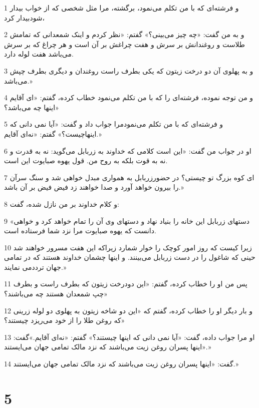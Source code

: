 \par 1 و فرشته‌ای که با من تکلم می‌نمود، برگشته، مرا مثل شخصی که از خواب بیدار شودبیدار کرد،
\par 2 و به من گفت: «چه چیز می‌بینی؟» گفتم: «نظر کردم و اینک شمعدانی که تمامش طلاست و روغندانش بر سرش و هفت چراغش بر آن است و هر چراغ که بر سرش می‌باشد هفت لوله دارد.
\par 3 و به پهلوی آن دو درخت زیتون که یکی بطرف راست روغندان و دیگری بطرف چپش می‌باشد.»
\par 4 و من توجه نموده، فرشته‌ای را که با من تکلم می‌نمود خطاب کرده، گفتم: «ای آقایم اینها چه می‌باشد؟»
\par 5 و فرشته‌ای که با من تکلم می‌نمودمرا جواب داد و گفت: «آیا نمی دانی که اینهاچیست؟» گفتم: «نه‌ای آقایم.»
\par 6 او در جواب من گفت: «این است کلامی که خداوند به زربابل می‌گوید: نه به قدرت و نه به قوت بلکه به روح من. قول یهوه صبایوت این است.
\par 7 ‌ای کوه بزرگ تو چیستی؟ در حضورزربابل به همواری مبدل خواهی شد و سنگ سرآن را بیرون خواهد آورد و صدا خواهند زد فیض فیض بر آن باشد.»
\par 8 و کلام خداوند بر من نازل شده، گفت:
\par 9 «دستهای زربابل این خانه را بنیاد نهاد و دستهای وی آن را تمام خواهد کرد و خواهی دانست که یهوه صبایوت مرا نزد شما فرستاده است.
\par 10 زیرا کیست که روز امور کوچک را خوار شمارد زیراکه این هفت مسرور خواهند شد حینی که شاغول را در دست زربابل می‌بینند. و اینها چشمان خداوند هستند که در تمامی جهان ترددمی نمایند.»
\par 11 پس من او را خطاب کرده، گفتم: «این دودرخت زیتون که بطرف راست و بطرف چپ شمعدان هستند چه می‌باشند؟»
\par 12 و بار دیگر او را خطاب کرده، گفتم که «این دو شاخه زیتون به پهلوی دو لوله زرینی که روغن طلا را از خود می‌ریزد چیستند؟»
\par 13 او مرا جواب داده، گفت: «آیا نمی دانی که اینها چیستند؟» گفتم: «نه‌ای آقایم.»گفت: «اینها پسران روغن زیت می‌باشند که نزد مالک تمامی جهان می‌ایستند.»
\par 14 گفت: «اینها پسران روغن زیت می‌باشند که نزد مالک تمامی جهان می‌ایستند.»

\chapter{5}

